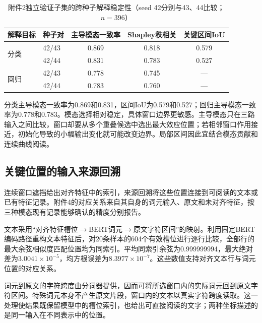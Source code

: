 \begin{table}[H]
\centering{}
\setlength{\tabcolsep}{4pt}
\caption{附件2独立验证子集的跨种子解释稳定性（seed 42分别与43、44比较；$n=396$）}
\label{tab:q3_seed_stability}
\begin{tabular}{@{}llccc@{}}
\toprule
解释目标 & 种子对 & 主导模态一致率 & Shapley秩相关 & 关键区间IoU\\
\midrule
\multirow{2}{*}{分类} & 42/43 & 0.869 & 0.818 & 0.579\\
 & 42/44 & 0.831 & 0.783 & 0.527\\
\multirow{2}{*}{回归} & 42/43 & 0.778 & 0.745 & ---\\
 & 42/44 & 0.783 & 0.760 & ---\\
\bottomrule
\end{tabular}
\par{}
\end{table}

\QThreeParagraph 分类主导模态一致率为0.869和0.831，区间IoU为0.579和0.527；回归主导模态一致率为0.778和0.783。模态选择相对稳定，具体窗口边界更敏感。主导模态只在三路输入之间比较，窗口却要从多个重叠候选中选出最大效应位置；若相邻窗口作用接近，初始化导致的小幅输出变化就可能改变边界。局部区间因此宜结合模态贡献和连续曲线阅读。

\subsection{关键位置的输入来源回溯}\label{subsec:q3_grounding}
\QThreeParagraph 连续窗口遮挡给出对齐特征中的索引，来源回溯将这些位置连接到可阅读的文本或已有特征记录。附件4的对应关系来自其自身的词元输入、原文和未对齐特征，按三种模态现有记录能够确认的精度分别报告。

\QThreeParagraph 文本采用“对齐特征槽位$\rightarrow$BERT词元$\rightarrow$原文字符区间”的映射。利用固定BERT编码路径重构文本特征后，对20条样本的604个有效槽位进行逐行比较，全部行的最大余弦相似度匹配位置均为同索引。平均同索引余弦为0.999999994，最大绝对差为$3.0041\times10^{-5}$，均方根误差为$8.3977\times10^{-7}$。这些数值支持对齐文本行与词元位置的对应关系。

\QThreeParagraph 词元到原文的字符跨度由分词器提供，因而可将所选窗口内的实际词元回到原文字符区间。特殊词元本身不产生原文片段，窗口内的文本以真实字符跨度读取。这一处理使结果既保留模型中的槽位索引，也给出可直接阅读的文字；两种坐标描述的是同一输入在不同表示中的位置。

